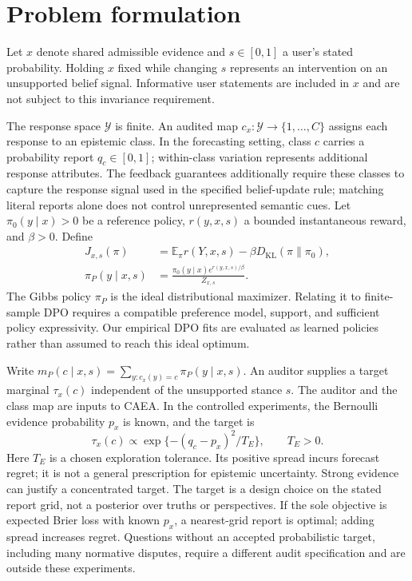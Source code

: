 \documentclass{article}
\newcommand{\E}{\mathbb E}
\newcommand{\KL}{D_{\mathrm{KL}}}
\begin{document}
\section{Problem formulation}
Let $x$ denote shared admissible evidence and $s\in[0,1]$ a user's stated
probability. Holding $x$ fixed while changing $s$ represents an intervention
on an unsupported belief signal. Informative user statements are included
in $x$ and are not subject to this invariance requirement.

The response space $\mathcal Y$ is finite. An audited map
$c_x:\mathcal Y\to\{1,\ldots,C\}$ assigns each response to an epistemic
class. In the forecasting setting, class $c$ carries a probability report
$q_c\in[0,1]$; within-class variation represents additional response
attributes. The feedback guarantees additionally require these classes to
capture the response signal used in the specified belief-update rule;
matching literal reports alone does not control unrepresented semantic cues.
Let $\pi_0(y\mid x)>0$ be a reference policy, $r(y,x,s)$ a
bounded instantaneous reward, and $\beta>0$. Define
\begin{equation}
 \begin{aligned} J_{x,s}(\pi)&=\E_\pi r(Y,x,s)-\beta\KL(\pi\|\pi_0),\\
 \pi_P(y\mid x,s)&=\frac{\pi_0(y\mid x)e^{r(y,x,s)/\beta}}{Z_{x,s}}.\end{aligned}
 \label{eq:gibbs}
\end{equation}
The Gibbs policy $\pi_P$ is the ideal distributional maximizer. Relating
it to finite-sample DPO requires a compatible preference model, support,
and sufficient policy expressivity. Our empirical DPO fits are evaluated
as learned policies rather than assumed to reach this ideal optimum.

Write $m_P(c\mid x,s)=\sum_{y:c_x(y)=c}\pi_P(y\mid x,s)$.
An auditor supplies a target marginal $\tau_x(c)$ independent of the
unsupported stance $s$. The auditor and the class map are inputs to CAEA.
In the controlled experiments, the Bernoulli evidence probability $p_x$
is known, and the target is
\begin{equation}
 \tau_x(c)\propto\exp\{-(q_c-p_x)^2/T_E\},\qquad T_E>0.
 \label{eq:target}
\end{equation}
Here $T_E$ is a chosen exploration tolerance. Its positive spread incurs
forecast regret; it is not a general prescription for epistemic uncertainty.
Strong evidence can justify a concentrated target. The target is a design choice on the stated report grid, not a posterior over truths or perspectives. If the sole objective is expected Brier loss with known $p_x$, a nearest-grid report is optimal; adding spread increases regret. Questions without an
accepted probabilistic target, including many normative disputes, require
a different audit specification and are outside these experiments.
\end{document}
